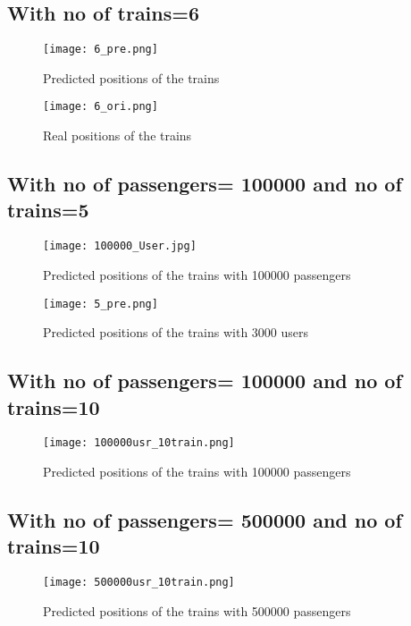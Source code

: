 \subsection{With no of trains=6 }
\begin{figure}[h!]
\begin{minipage}{.5\textwidth}

\centering
\texttt{[image: 6\_pre.png]}
\caption{Predicted positions of the trains}

\end{minipage}%
\begin{minipage}{.5\textwidth}

\centering
\texttt{[image: 6\_ori.png]}
\caption{Real positions of the trains}

\end{minipage}%
\end{figure}
\newpage
\subsection{With no of passengers= 100000 and no of trains=5 }
\begin{figure}[h!]
\begin{minipage}{.5\textwidth}

\centering
\texttt{[image: 100000\_User.jpg]}
\caption{Predicted positions of the trains with 100000 passengers}

\end{minipage}%
\begin{minipage}{.5\textwidth}

\centering
\texttt{[image: 5\_pre.png]}
\caption{Predicted positions of the trains with 3000 users}

\end{minipage}%
\end{figure}

\newpage
\subsection{With no of passengers= 100000 and no of trains=10 }
\begin{figure}[h!]

\centering
\texttt{[image: 100000usr\_10train.png]}
\caption{Predicted positions of the trains with 100000 passengers}

\end{figure}

\newpage
\subsection{With no of passengers= 500000 and no of trains=10 }
\begin{figure}[h!]

\centering
\texttt{[image: 500000usr\_10train.png]}
\caption{Predicted positions of the trains with 500000 passengers}

\end{figure}







